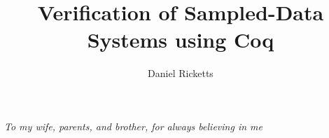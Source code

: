 \documentclass[12pt]{ucsddissertation}
\title{Verification of Sampled-Data Systems using Coq}
\author{Daniel Ricketts}
\begin{document}
\frontmatter
\maketitle
\makecopyright
\makesignature
\begin{dedication}
\setsinglespacing
\raggedright %
\parindent0pt\parskip\baselineskip
\centering
\emph{To my wife, parents, and brother, for always believing in me}
\end{dedication}

\tableofcontents
\listoffigures
\listoftables
\end{document}
